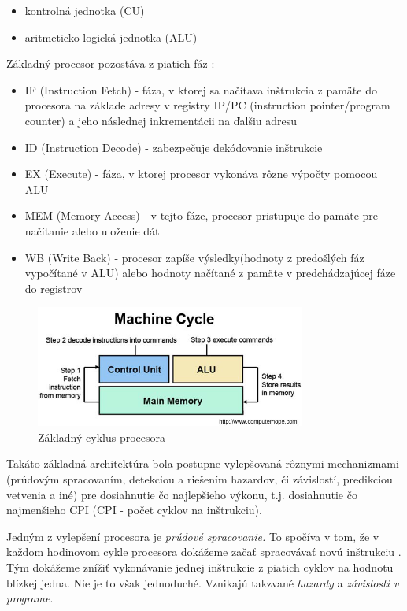 \documentclass[conference]{IEEEtran}
\begin{document}
\begin{itemize}
	\item{kontrolná jednotka (CU)}
	\item{aritmeticko-logická jednotka (ALU)}
\end{itemize}

Základný procesor pozostáva z piatich fáz \cite{hennessy2007compute}: 

\begin{itemize}
	\item{IF (Instruction Fetch) - fáza, v ktorej sa načítava inštrukcia z pamäte do procesora na základe adresy v registry IP/PC (instruction pointer/program counter) a jeho následnej inkrementácii na ďalšiu adresu }
	\item{ID (Instruction Decode) - zabezpečuje dekódovanie inštrukcie}
	\item{EX (Execute) - fáza, v ktorej procesor vykonáva rôzne výpočty pomocou ALU}
	\item{MEM (Memory Access) - v tejto fáze, procesor pristupuje do pamäte pre načítanie alebo uloženie dát}
	\item{WB (Write Back) - procesor zapíše výsledky(hodnoty z predošlých fáz vypočítané v ALU) alebo hodnoty načítané z pamäte v predchádzajúcej fáze do registrov}
\end{itemize}

\begin{figure}[!h]
\centering
\includegraphics[width=3.5in]{img/CPU-cycle}
\caption{Základný cyklus procesora}
\end{figure}

Takáto základná architektúra bola postupne vylepšovaná rôznymi mechanizmami (prúdovým spracovaním, detekciou a riešením hazardov, či závislostí, predikciou vetvenia a iné) pre dosiahnutie čo najlepšieho výkonu, t.j. dosiahnutie čo najmenšieho CPI (CPI - počet cyklov na inštrukciu).

Jedným z vylepšení procesora je \textit{prúdové spracovanie.} To spočíva v tom, že v každom hodinovom cykle procesora dokážeme začať spracovávať novú inštrukciu \cite{hennessy2007compute}. Tým dokážeme znížiť vykonávanie jednej inštrukcie z piatich cyklov  na hodnotu blízkej jedna. Nie je to však jednoduché. Vznikajú takzvané \textit{hazardy} a \textit{závislosti v programe}. 
\end{document}
